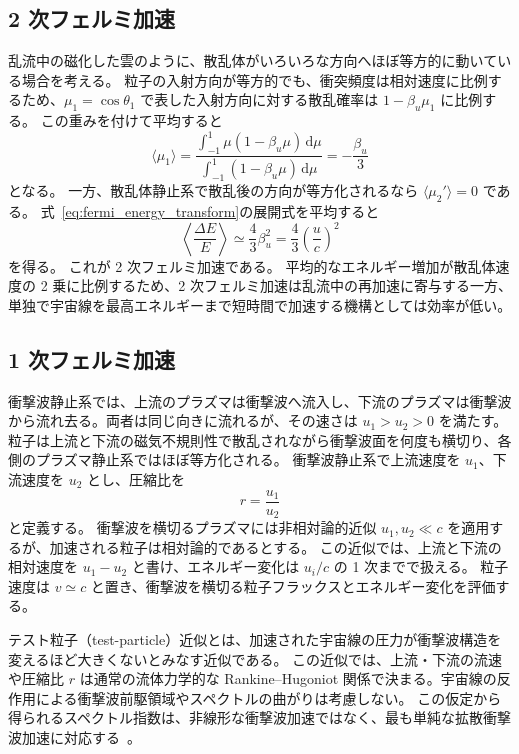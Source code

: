 \documentclass[book,paper=a4,fontsize=11pt]{jlreq}
\begin{document}
\subsection{2 次フェルミ加速}
乱流中の磁化した雲のように、散乱体がいろいろな方向へほぼ等方的に動いている場合を考える。
粒子の入射方向が等方的でも、衝突頻度は相対速度に比例するため、\(\mu_1=\cos\theta_1\) で表した入射方向に対する散乱確率は \(1-\beta_u\mu_1\) に比例する。
この重みを付けて平均すると
\begin{equation}
  \langle\mu_1\rangle
  =
  \frac{\int_{-1}^{1}\mu(1-\beta_u\mu)\,\mathrm{d}\mu}
       {\int_{-1}^{1}(1-\beta_u\mu)\,\mathrm{d}\mu}
  =
  -\frac{\beta_u}{3}
\end{equation}
となる。
一方、散乱体静止系で散乱後の方向が等方化されるなら \(\langle\mu_2'\rangle=0\) である。
式~\eqref{eq:fermi_energy_transform}の展開式を平均すると
\begin{equation}
  \left\langle\frac{\Delta E}{E}\right\rangle
  \simeq
  \frac{4}{3}\beta_u^2
  =
  \frac{4}{3}
  \left(\frac{u}{c}\right)^2
\end{equation}
を得る。
これが 2 次フェルミ加速である。
平均的なエネルギー増加が散乱体速度の 2 乗に比例するため、2 次フェルミ加速は乱流中の再加速に寄与する一方、単独で宇宙線を最高エネルギーまで短時間で加速する機構としては効率が低い。

\subsection{1 次フェルミ加速}
衝撃波静止系では、上流のプラズマは衝撃波へ流入し、下流のプラズマは衝撃波から流れ去る。両者は同じ向きに流れるが、その速さは \(u_1>u_2>0\) を満たす。
粒子は上流と下流の磁気不規則性で散乱されながら衝撃波面を何度も横切り、各側のプラズマ静止系ではほぼ等方化される。
衝撃波静止系で上流速度を \(u_1\)、下流速度を \(u_2\) とし、圧縮比を
\begin{equation}
  r=\frac{u_1}{u_2}
\end{equation}
と定義する。
衝撃波を横切るプラズマには非相対論的近似 \(u_1,u_2\ll c\) を適用するが、加速される粒子は相対論的であるとする。
この近似では、上流と下流の相対速度を \(u_1-u_2\) と書け、エネルギー変化は \(u_i/c\) の 1 次までで扱える。
粒子速度は \(v\simeq c\) と置き、衝撃波を横切る粒子フラックスとエネルギー変化を評価する。

テスト粒子（test-particle）近似とは、加速された宇宙線の圧力が衝撃波構造を変えるほど大きくないとみなす近似である。
この近似では、上流・下流の流速や圧縮比 \(r\) は通常の流体力学的な Rankine--Hugoniot 関係で決まる。宇宙線の反作用による衝撃波前駆領域やスペクトルの曲がりは考慮しない。
この仮定から得られるスペクトル指数は、非線形な衝撃波加速ではなく、最も単純な拡散衝撃波加速に対応する~\cite{Drury1983}。
\end{document}
